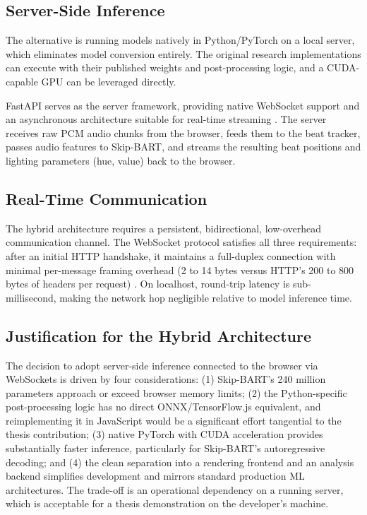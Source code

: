 \subsection{Server-Side Inference}

The alternative is running models natively in Python/PyTorch on a local server, which eliminates model conversion entirely. The original research implementations can execute with their published weights and post-processing logic, and a CUDA-capable GPU can be leveraged directly.

FastAPI serves as the server framework, providing native WebSocket support and an asynchronous architecture suitable for real-time streaming \cite{fastapi-docs}. The server receives raw PCM audio chunks from the browser, feeds them to the beat tracker, passes audio features to Skip-BART, and streams the resulting beat positions and lighting parameters (hue, value) back to the browser.

\subsection{Real-Time Communication}

The hybrid architecture requires a persistent, bidirectional, low-overhead communication channel. The WebSocket protocol satisfies all three requirements: after an initial HTTP handshake, it maintains a full-duplex connection with minimal per-message framing overhead (2 to 14 bytes versus HTTP's 200 to 800 bytes of headers per request) \cite{postman-websockets-vs-http}. On localhost, round-trip latency is sub-millisecond, making the network hop negligible relative to model inference time.

\subsection{Justification for the Hybrid Architecture}

The decision to adopt server-side inference connected to the browser via WebSockets is driven by four considerations: (1) Skip-BART's 240 million parameters approach or exceed browser memory limits; (2) the Python-specific post-processing logic has no direct ONNX/TensorFlow.js equivalent, and reimplementing it in JavaScript would be a significant effort tangential to the thesis contribution; (3) native PyTorch with CUDA acceleration provides substantially faster inference, particularly for Skip-BART's autoregressive decoding; and (4) the clean separation into a rendering frontend and an analysis backend simplifies development and mirrors standard production ML architectures. The trade-off is an operational dependency on a running server, which is acceptable for a thesis demonstration on the developer's machine.


